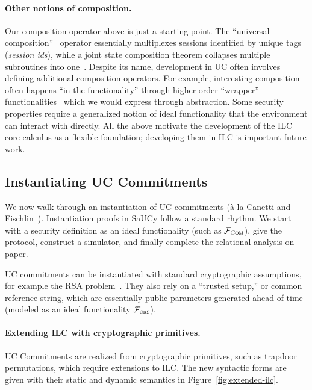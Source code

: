 \paragraph{Other notions of composition.}
Our composition operator above is just a starting point.
The ``universal composition''~\cite{canetti2001universally} operator essentially multiplexes sessions identified by unique tags (\emph{session ids}), while a joint state composition theorem collapses multiple subroutines into one~\cite{canetti2003universal}.
Despite its name, development in UC often involves defining additional composition operators. 
For example, interesting composition often happens ``in the functionality'' through higher order ``wrapper'' functionalities~\cite{kosba2016hawk,katz2007universally} which we would express through abstraction. Some security properties require a generalized notion of ideal functionality that the environment can interact with directly. All the above motivate the development of the ILC core calculus as a flexible foundation; developing them in ILC is important future work.


\subsection{Instantiating UC Commitments}
\label{subsec:example}
We now walk through an instantiation of UC commitments (\`{a} la Canetti and
Fischlin~\cite{canetti2001commitments}).  Instantiation proofs in SaUCy follow a
standard rhythm. We start with a security definition as an ideal functionality
(such as $\mathcal{{F}}_{\textsc{Com}}$), give the protocol, construct a simulator, and
finally complete the relational analysis on paper.

UC commitments can be instantiated with standard cryptographic assumptions, for
example the RSA problem~\cite{lindell2014introduction}.  They also rely on a
``trusted setup,'' or common reference string, which are essentially public
parameters generated ahead of time (modeled as an ideal functionality
$\mathcal{{F}}_{\textsc{crs}}$).

\paragraph{Extending ILC with cryptographic primitives.}
UC Commitments are realized from cryptographic primitives, such as trapdoor
permutations, which require extensions to ILC. The new syntactic forms are given
with their static and dynamic semantics in Figure~\ref{fig:extended-ilc}.

